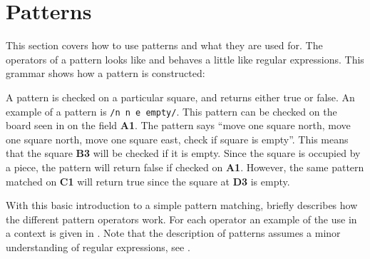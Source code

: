 \section{Patterns}
\label{sec:patterns}

This section covers how to use patterns and what they are used for. The operators
of a pattern looks like and behaves a little like regular expressions. This
grammar shows how a pattern is constructed:

\begin{ebnf}
\end{ebnf}


A pattern is checked on a particular square, and returns either true or false.
An example of a pattern is \texttt{/n n e empty/}. This pattern can be checked on
the board seen in  on the field \textbf{A1}. The pattern
says ``move one square north, move one square north, move one square east, check if
square is empty''. This means that the square \textbf{B3} will be checked if it
is empty. Since the square is occupied by a piece, the pattern will return
false if checked on \textbf{A1}. However, the same pattern matched on
\textbf{C1} will return true since the square at \textbf{D3} is empty.


With this basic introduction to a simple pattern matching,
 briefly describes how the different pattern
operators work. For each operator an example of the use in a context is given
in . Note that the description of patterns assumes a
minor understanding of regular expressions, see \cite{regex}.

